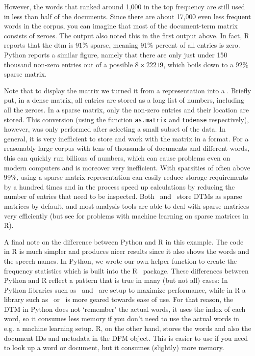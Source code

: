 However, the words that ranked around 1,000 in the top frequency are still used in less than half of the documents.
Since there are about 17,000 even less frequent words in the corpus, you can imagine that most of the document-term matrix consists of zeroes. 
The output also noted this  in the first output above.
In fact, R reports that the dtm is $91\%$ sparse, meaning 91\% percent of all entries is zero.
Python reports a similar figure, namely that there are only just under 150 thousand non-zero entries
out of a possible $8\times22219$, which boils down to a 92\% sparse matrix.

Note that to display the matrix we turned it from a  representation into a .
Briefly put, in a dense matrix, all entries are stored as a long list of numbers, including all the zeroes.
In a sparse matrix,  only the non-zero entries and their location are stored. 
This conversion (using the function \verb|as.matrix| and \verb|todense| respectively), however, was only performed after selecting a small subset of the data.
In general,  it is very inefficient to store and work with the matrix in a  format.
For a reasonably large corpus with tens of thousands of documents and different words, this can quickly run billions of numbers,
which can cause problems even on modern computers and is moreover very inefficient.
With sparsities of often above 99\%, using a sparse matrix representation can easily reduce storage requirements by a hundred times and in the process speed up calculations by reducing the number of entries that need to be inspected.
Both \quanteda\ and \sklearn\ store DTMs as sparse matrices by default,
and most analysis tools are able to deal with sparse matrices very efficiently
(but see  for problems with machine learning on sparse matrices in R). 

A final note on the difference between Python and R in this example.
The code in R is much simpler and produces nicer results since it also shows the words and the speech names.
In Python, we wrote our own helper function to create the frequency statistics which is built into the R \quanteda\ package.
These differences between Python and R reflect a pattern that is true in many (but not all) cases:
In Python libraries such as \numpy\ and \sklearn\ are setup to maximize performance,
while in R a library such as \quanteda\ or \tidyverse\ is more geared towards ease of use.
For that reason, the DTM in Python does not `remember' the actual words, it uses the index of each word,
so it consumes less memory if you don't need to use the actual words in e.g. a machine learning setup.
R, on the other hand, stores the words and also the document IDs and metadata in the DFM object.
This is easier to use if you need to look up a word or document, but it consumes (slightly) more memory. 


